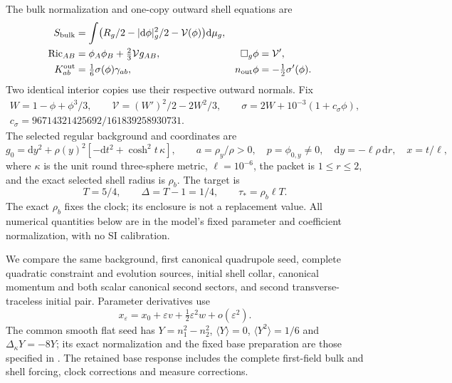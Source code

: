 \documentclass[11pt]{article}
\newcommand{\eps}{\varepsilon}
\newcommand{\dd}{\mathrm d}
\newcommand{\cV}{\mathcal V}
\begin{document}
The bulk normalization and one-copy outward shell equations are
\begin{align}
 S_{\rm bulk}&=\int\bigl(R_g/2-|\dd\phi|_g^2/2-\cV(\phi)\bigr)\dd\mu_g,
 \nonumber\\
 \operatorname{Ric}_{AB}&=\phi_A\phi_B+\tfrac23\cV g_{AB},
 &\Box_g\phi&=\cV',\nonumber\\
 K^{\rm out}_{ab}&=\tfrac16\sigma(\phi)\gamma_{ab},
 &n_{\rm out}\phi&=-\tfrac12\sigma'(\phi).
 \label{eq:model}
\end{align}
Two identical interior copies use their respective outward normals. Fix
\begin{gather}
 W=1-\phi+\phi^3/3,\qquad
 \cV=(W')^2/2-2W^2/3,\qquad
 \sigma=2W+10^{-3}(1+c_\sigma\phi),\nonumber\\
 c_\sigma=96714321425692/161839258930731.
 \label{eq:potential}
\end{gather}
The selected regular background and coordinates are
\begin{equation}
 g_0=\dd y^2+\rho(y)^2[-\dd t^2+\cosh^2t\,\kappa],\qquad
 a=\rho_y/\rho>0,\quad p=\phi_{0,y}\ne0,\quad
 \dd y=-\ell\rho\,\dd r,\quad x=t/\ell,
 \label{eq:background}
\end{equation}
where $\kappa$ is the unit round three-sphere metric, $\ell=10^{-6}$,
the packet is $1\le r\le2$, and the exact selected shell radius is $\rho_b$.
The target is
\begin{equation}
 T=5/4,\qquad \Delta=T-1=1/4,\qquad \tau_*=\rho_b\ell T.
 \label{eq:target}
\end{equation}
The exact $\rho_b$ fixes the clock; its enclosure is not a replacement
value. All numerical quantities below are in the model's fixed parameter
and coefficient normalization, with no SI calibration.

We compare the same background, first canonical quadrupole seed, complete
quadratic constraint and evolution sources, initial shell collar, canonical
momentum and both scalar canonical second sectors, and second
transverse-traceless initial pair. Parameter derivatives use
\begin{equation}
 x_\eps=x_0+\eps v+\tfrac12\eps^2w+o(\eps^2).
 \label{eq:normalization}
\end{equation}
The common smooth flat seed has $Y=n_1^2-n_2^2$,
$\langle Y\rangle=0$, $\langle Y^2\rangle=1/6$ and
$\Delta_\kappa Y=-8Y$; its exact normalization and the fixed base
preparation are those specified in \cite{preparation,intrinsic}.
The retained base response includes the complete first-field bulk and
shell forcing, clock corrections and measure corrections.
\end{document}
